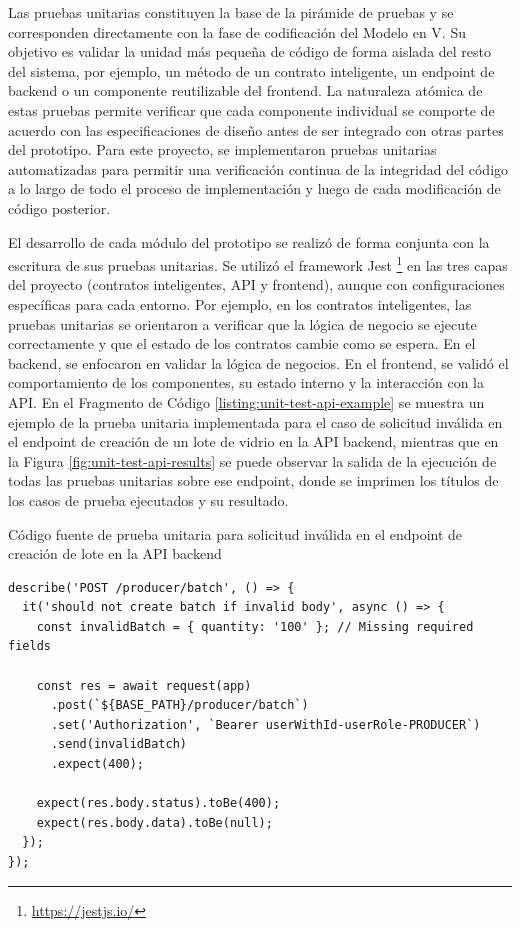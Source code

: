 Las pruebas unitarias constituyen la base de la pirámide de pruebas y se corresponden directamente con la fase de codificación del Modelo en V. Su objetivo es validar la unidad más pequeña de código de forma aislada del resto del sistema, por ejemplo, un método de un contrato inteligente, un endpoint de backend o un componente reutilizable del frontend. La naturaleza atómica de estas pruebas permite verificar que cada componente individual se comporte de acuerdo con las especificaciones de diseño antes de ser integrado con otras partes del prototipo. Para este proyecto, se implementaron pruebas unitarias automatizadas para permitir una verificación continua de la integridad del código a lo largo de todo el proceso de implementación y luego de cada modificación de código posterior.

El desarrollo de cada módulo del prototipo se realizó de forma conjunta con la escritura de sus pruebas unitarias. Se utilizó el framework Jest \footnote{\url{https://jestjs.io/}} en las tres capas del proyecto (contratos inteligentes, API y frontend), aunque con configuraciones específicas para cada entorno. Por ejemplo, en los contratos inteligentes, las pruebas unitarias se orientaron a verificar que la lógica de negocio se ejecute correctamente y que el estado de los contratos cambie como se espera. En el backend, se enfocaron en validar la lógica de negocios. En el frontend, se validó el comportamiento de los componentes, su estado interno y la interacción con la API. En el Fragmento de Código \ref{listing:unit-test-api-example} se muestra un ejemplo de la prueba unitaria implementada para el caso de solicitud inválida en el endpoint de creación de un lote de vidrio en la API backend, mientras que en la Figura \ref{fig:unit-test-api-results} se puede observar la salida de la ejecución de todas las pruebas unitarias sobre ese endpoint, donde se imprimen los títulos de los casos de prueba ejecutados y su resultado.


\begin{listing}[!tp]
\caption{Código fuente de prueba unitaria para solicitud inválida en el endpoint de creación de lote en la API backend}
\label{listing:unit-test-api-example}
\begin{verbatim}
describe('POST /producer/batch', () => {
  it('should not create batch if invalid body', async () => {
    const invalidBatch = { quantity: '100' }; // Missing required fields

    const res = await request(app)
      .post(`${BASE_PATH}/producer/batch`)
      .set('Authorization', `Bearer userWithId-userRole-PRODUCER`)
      .send(invalidBatch)
      .expect(400);

    expect(res.body.status).toBe(400);
    expect(res.body.data).toBe(null);
  });
});
\end{verbatim}
\end{listing}

